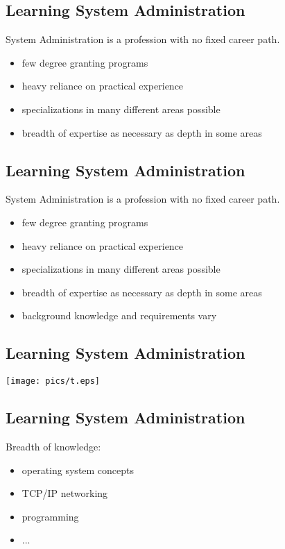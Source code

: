 \documentclass[xga]{xdvislides}
\begin{document}
\subsection{Learning System Administration}
System Administration is a profession with no fixed career path.

\begin{itemize}
	\item few degree granting programs
	\item heavy reliance on practical experience
	\item specializations in many different areas possible
	\item breadth of expertise as necessary as depth in some areas
\end{itemize}


\subsection{Learning System Administration}
System Administration is a profession with no fixed career path.

\begin{itemize}
	\item few degree granting programs
	\item heavy reliance on practical experience
	\item specializations in many different areas possible
	\item breadth of expertise as necessary as depth in some areas
	\item background knowledge and requirements vary
\end{itemize}

\subsection{Learning System Administration}
\vfill
\begin{center}
	\texttt{[image: pics/t.eps]}
\end{center}
\vfill

\subsection{Learning System Administration}

Breadth of knowledge:
\begin{itemize}
	\item operating system concepts
	\item TCP/IP networking
	\item programming
	\item ...
\end{itemize}
\vspace{.5in}
\end{document}

